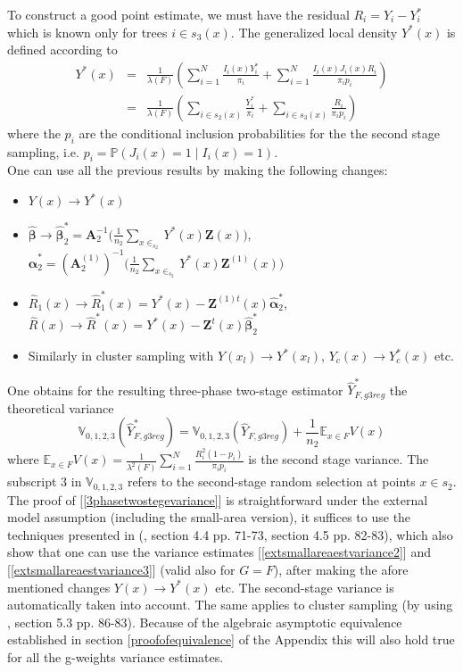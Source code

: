 \documentclass[a4paper,12pt,leqno, titlepage]{article}
\newcommand{\LF}{\ensuremath{\lambda(F)}}
\newcommand{\EX}{\mathbb{E}}
\newcommand{\PR}{\mathbb{P}}
\newcommand{\VAR}{\mathbb{V}}
\begin{document}
 \par To construct a good point estimate, we must have
 the residual $R_i=Y_i-Y_i^*$ which is known only for trees
 $i\in{s_{3}(x)}$. The generalized local density $Y^*(x)$ is defined
 according to    
 \begin{eqnarray}\label{gdens}
 Y^*(x)&=&\frac{1}{\LF}\left( \sum_{i=1}^N \frac{I_{i}(x)Y_i^*}{\pi_i} +
 \sum_{i=1}^N \frac{I_{i}(x)J_{i}(x)R_i}{\pi_{i}p_i}\right)\nonumber \\
 &=&\frac{1}{\LF}\left( \sum_{i\in{s_{2}(x)}} \frac{Y_i^*}{\pi_i}
 +\sum_{i\in{s_{3}(x)}} \frac{R_i}{\pi_{i}p_i}\right)
 \end{eqnarray}
 where the $p_i$ are the conditional inclusion probabilities for the the second stage sampling, i.e. $p_i=\PR(J_i(x)=1 \mid I_i(x)=1)$.\\
  One can use all the previous results by making the following changes:\\
  \begin{itemize}
  \item
   $Y(x)\rightarrow Y^{*}(x)$
    \item $\hat{\pmb{\beta}}\rightarrow \hat{\pmb{\beta}}_2^{*}=\pmb{A}_2^{-1}\Big(\frac{1}{n_2}\sum_{x\in_{s_2}}Y^{*}(x)\pmb{Z}(x)\Big)$,
  $\hat{\pmb{\alpha}}_2^{*}=(\pmb{A}^{(1)}_2)^{-1}\Big(\frac{1}{n_2}\sum_{x\in_{s_2}}Y^{*}(x)\pmb{Z}^{(1)}(x)\Big)$
\item
  $\hat{R}_1(x)\rightarrow\hat{R}_1^{*}(x)=Y^{*}(x)-\pmb{Z}^{(1)t}(x)\hat{\pmb{\alpha}}_2^{*}$,
   $\hat{R}(x)\rightarrow \hat{R}^{*}(x)=Y^{*}(x)-\pmb{Z}^t(x)\hat{\pmb{\beta}}_2^{*}$
    \item
   Similarly in cluster sampling with $Y(x_l)\rightarrow Y^{*}(x_l)$, $Y_c(x)\rightarrow Y_c^{*}(x)$ etc.
   \end{itemize}
 One obtains for the resulting three-phase two-stage estimator $\hat{Y}^{*}_{F,g3reg}$ the theoretical variance
 \begin{equation}\label{3phasetwostegevariance}
 \VAR_{0,1,2,3}(\hat{Y}^{*}_{F,g3reg})=\VAR_{0,1,2,3}(\hat{Y}_{F,g3reg})+\frac{1}{n_2}\EX_{x\in{F}}V(x)
 \end{equation}
 \noindent where $\EX_{x\in{F}}V(x)=\frac{1}{\lambda^2(F)}\sum_{i=1}^N\frac{R_i^2(1-p_i)}{\pi_ip_i}$ is the second stage variance. The subscript $3$ in $\VAR_{0,1,2,3}$ refers to the second-stage random selection at points $x\in{s_2}$.\\
 The proof of [\ref{3phasetwostegevariance}] is straightforward under the external model assumption (including the small-area version), it suffices to use the techniques presented in (\cite{mandallaz}, section 4.4 pp. 71-73, section 4.5 pp. 82-83), which also show that one can use the variance estimates [\ref{extsmallareaestvariance2}] and [\ref{extsmallareaestvariance3}] (valid also for $G=F$), after making the afore mentioned changes $Y(x)\rightarrow Y^{*}(x)$ etc. The second-stage variance is automatically taken into account. The same applies to cluster sampling (by using \cite{mandallaz}, section 5.3 pp. 86-83). Because of the algebraic asymptotic equivalence established in section \ref{proofofequivalence} of the Appendix this will also hold true for all the g-weights variance estimates.
\end{document}
